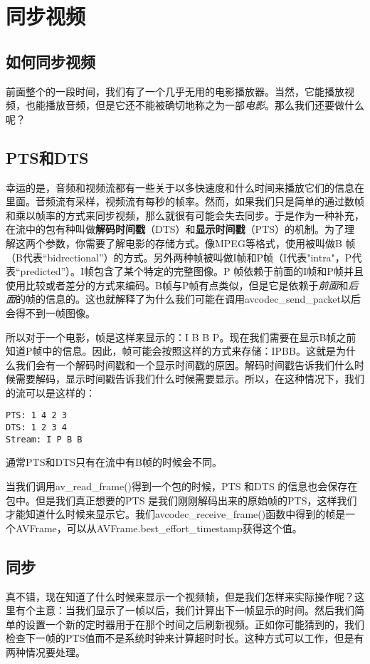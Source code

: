 ﻿\chapter{同步视频}
\label{ch5}
\section{如何同步视频}
前面整个的一段时间，我们有了一个几乎无用的电影播放器。当然，它能播放视频，也能播放音频，但是它还不能被确切地称之为一部\emph{电影}。那么我们还要做什么呢？
\section{PTS和DTS}
幸运的是，音频和视频流都有一些关于以多快速度和什么时间来播放它们的信息在里面。音频流有采样，视频流有每秒的帧率。然而，如果我们只是简单的通过数帧和乘以帧率的方式来同步视频，那么就很有可能会失去同步。于是作为一种补充，在流中的包有种叫做\textbf{解码时间戳}（DTS）和\textbf{显示时间戳}（PTS）的机制。为了理解这两个参数，你需要了解电影的存储方式。像MPEG等格式，使用被叫做B 帧（B代表“bidrectional”）的方式。另外两种帧被叫做I帧和P帧（I代表"intra"，P代表“predicted”）。I帧包含了某个特定的完整图像。P 帧依赖于前面的I帧和P帧并且使用比较或者差分的方式来编码。B帧与P帧有点类似，但是它是依赖于\emph{前面}和\emph{后面}的帧的信息的。这也就解释了为什么我们可能在调用avcodec_send_packet以后会得不到一帧图像。

所以对于一个电影，帧是这样来显示的：I B B P。现在我们需要在显示B帧之前知道P帧中的信息。因此，帧可能会按照这样的方式来存储：IPBB。这就是为什么我们会有一个解码时间戳和一个显示时间戳的原因。解码时间戳告诉我们什么时候需要解码，显示时间戳告诉我们什么时候需要显示。所以，在这种情况下，我们的流可以是这样的：

\begin{verbatim}
PTS: 1 4 2 3
DTS: 1 2 3 4
Stream: I P B B
\end{verbatim}

通常PTS和DTS只有在流中有B帧的时候会不同。

当我们调用av_read_frame()得到一个包的时候，PTS 和DTS 的信息也会保存在包中。但是我们真正想要的PTS 是我们刚刚解码出来的原始帧的PTS，这样我们才能知道什么时候来显示它。我们avcodec_receive_frame()函数中得到的帧是一个AVFrame，可以从AVFrame.best_effort_timestamp获得这个值。

\section{同步}

真不错，现在知道了什么时候来显示一个视频帧，但是我们怎样来实际操作呢？这里有个主意：当我们显示了一帧以后，我们计算出下一帧显示的时间。然后我们简单的设置一个新的定时器用于在那个时间之后刷新视频。正如你可能猜到的，我们检查下一帧的PTS值而不是系统时钟来计算超时时长。这种方式可以工作，但是有两种情况要处理。

